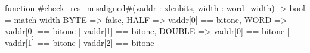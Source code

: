 function #\hyperref[sailRISCVzcheckzyreszymisaligned]{check\_res\_misaligned}#(vaddr : xlenbits, width : word_width) -> bool =
  match width {
    BYTE   => false,
    HALF   => vaddr[0] == bitone,
    WORD   => vaddr[0] == bitone | vaddr[1] == bitone,
    DOUBLE => vaddr[0] == bitone | vaddr[1] == bitone | vaddr[2] == bitone
  }
